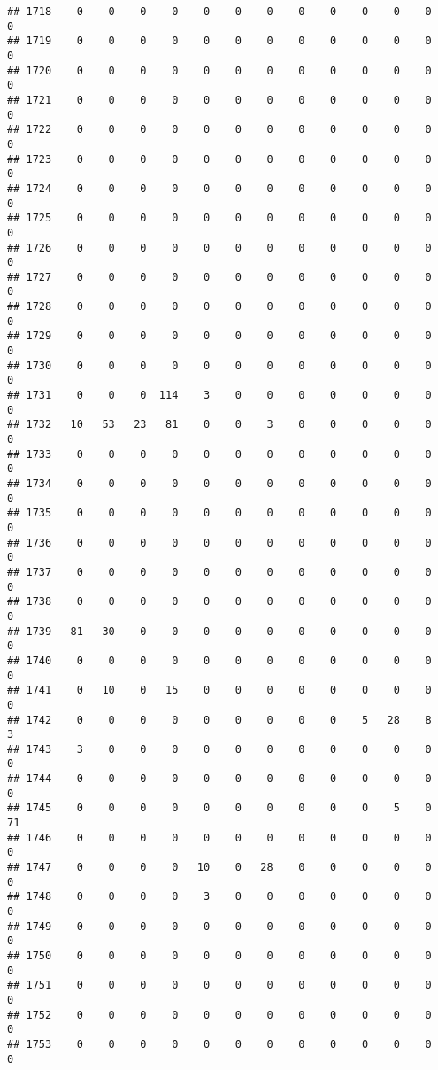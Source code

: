 \documentclass[]{article}
\begin{document}
\begin{verbatim}
## 1718    0    0    0    0    0    0    0    0    0    0    0    0    0
## 1719    0    0    0    0    0    0    0    0    0    0    0    0    0
## 1720    0    0    0    0    0    0    0    0    0    0    0    0    0
## 1721    0    0    0    0    0    0    0    0    0    0    0    0    0
## 1722    0    0    0    0    0    0    0    0    0    0    0    0    0
## 1723    0    0    0    0    0    0    0    0    0    0    0    0    0
## 1724    0    0    0    0    0    0    0    0    0    0    0    0    0
## 1725    0    0    0    0    0    0    0    0    0    0    0    0    0
## 1726    0    0    0    0    0    0    0    0    0    0    0    0    0
## 1727    0    0    0    0    0    0    0    0    0    0    0    0    0
## 1728    0    0    0    0    0    0    0    0    0    0    0    0    0
## 1729    0    0    0    0    0    0    0    0    0    0    0    0    0
## 1730    0    0    0    0    0    0    0    0    0    0    0    0    0
## 1731    0    0    0  114    3    0    0    0    0    0    0    0    0
## 1732   10   53   23   81    0    0    3    0    0    0    0    0    0
## 1733    0    0    0    0    0    0    0    0    0    0    0    0    0
## 1734    0    0    0    0    0    0    0    0    0    0    0    0    0
## 1735    0    0    0    0    0    0    0    0    0    0    0    0    0
## 1736    0    0    0    0    0    0    0    0    0    0    0    0    0
## 1737    0    0    0    0    0    0    0    0    0    0    0    0    0
## 1738    0    0    0    0    0    0    0    0    0    0    0    0    0
## 1739   81   30    0    0    0    0    0    0    0    0    0    0    0
## 1740    0    0    0    0    0    0    0    0    0    0    0    0    0
## 1741    0   10    0   15    0    0    0    0    0    0    0    0    0
## 1742    0    0    0    0    0    0    0    0    0    5   28    8    3
## 1743    3    0    0    0    0    0    0    0    0    0    0    0    0
## 1744    0    0    0    0    0    0    0    0    0    0    0    0    0
## 1745    0    0    0    0    0    0    0    0    0    0    5    0   71
## 1746    0    0    0    0    0    0    0    0    0    0    0    0    0
## 1747    0    0    0    0   10    0   28    0    0    0    0    0    0
## 1748    0    0    0    0    3    0    0    0    0    0    0    0    0
## 1749    0    0    0    0    0    0    0    0    0    0    0    0    0
## 1750    0    0    0    0    0    0    0    0    0    0    0    0    0
## 1751    0    0    0    0    0    0    0    0    0    0    0    0    0
## 1752    0    0    0    0    0    0    0    0    0    0    0    0    0
## 1753    0    0    0    0    0    0    0    0    0    0    0    0    0

\end{verbatim}
\end{document}
